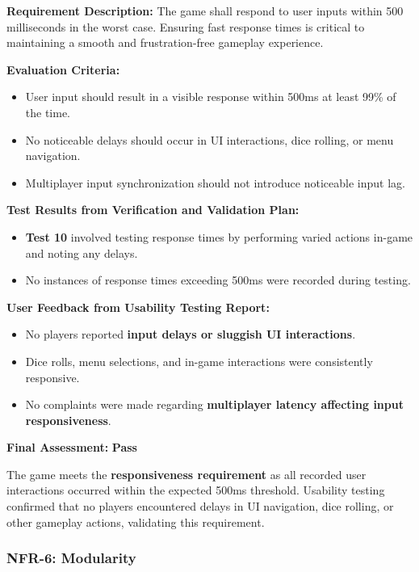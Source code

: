 \documentclass[12pt, titlepage]{article}
\begin{document}
\textbf{Requirement Description:}  
The game shall respond to user inputs within 500 milliseconds in the worst case. Ensuring fast response times is critical to maintaining a smooth and frustration-free gameplay experience.

\textbf{Evaluation Criteria:}  
\begin{itemize}
    \item User input should result in a visible response within 500ms at least 99\% of the time.
    \item No noticeable delays should occur in UI interactions, dice rolling, or menu navigation.
    \item Multiplayer input synchronization should not introduce noticeable input lag.
\end{itemize}

\textbf{Test Results from Verification and Validation Plan:}  
\begin{itemize}
    \item \textbf{Test 10} involved testing response times by performing varied actions in-game and noting any delays.
    \item No instances of response times exceeding 500ms were recorded during testing.
\end{itemize}

\textbf{User Feedback from Usability Testing Report:}  
\begin{itemize}
    \item No players reported \textbf{input delays or sluggish UI interactions}.
    \item Dice rolls, menu selections, and in-game interactions were consistently responsive.
    \item No complaints were made regarding \textbf{multiplayer latency affecting input responsiveness}.
\end{itemize}

\textbf{Final Assessment:} \textbf{Pass}  

The game meets the \textbf{responsiveness requirement} as all recorded user interactions occurred within the expected 500ms threshold. Usability testing confirmed that no players encountered delays in UI navigation, dice rolling, or other gameplay actions, validating this requirement.


\subsubsection{NFR-6: Modularity}
\label{NFR6}
\end{document}
